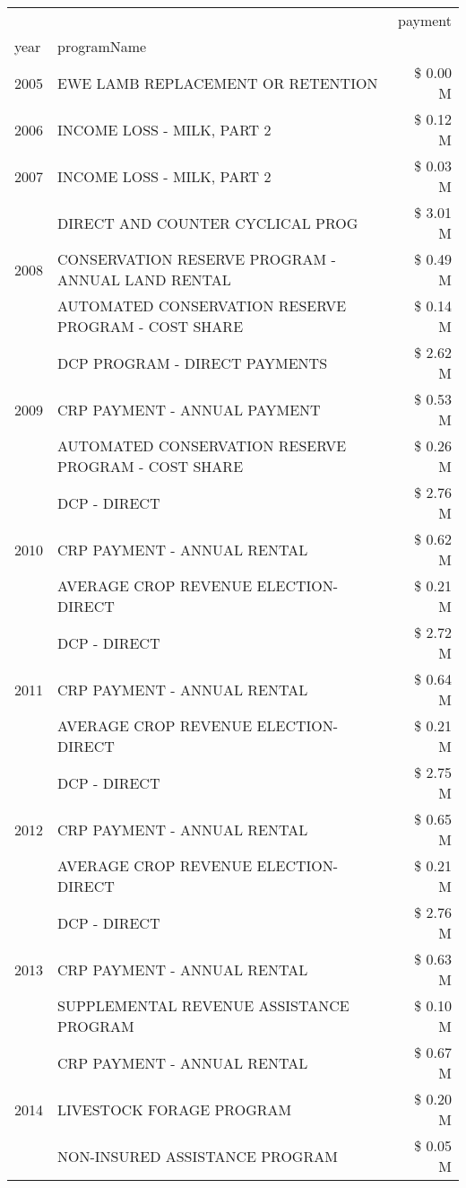 \begin{tabular}{llr}
\toprule
 &  & payment \\
year & programName &  \\
\midrule
2005 & EWE LAMB REPLACEMENT OR RETENTION & \$ 0.00 M \\
\cline{1-3}
2006 & INCOME LOSS - MILK, PART 2 & \$ 0.12 M \\
\cline{1-3}
2007 & INCOME LOSS - MILK, PART 2 & \$ 0.03 M \\
\cline{1-3}
\multirow[t]{3}{*}{2008} & DIRECT AND COUNTER CYCLICAL PROG & \$ 3.01 M \\
 & CONSERVATION RESERVE PROGRAM - ANNUAL LAND RENTAL & \$ 0.49 M \\
 & AUTOMATED CONSERVATION RESERVE PROGRAM - COST SHARE & \$ 0.14 M \\
\cline{1-3}
\multirow[t]{3}{*}{2009} & DCP PROGRAM - DIRECT PAYMENTS & \$ 2.62 M \\
 & CRP PAYMENT - ANNUAL PAYMENT & \$ 0.53 M \\
 & AUTOMATED CONSERVATION RESERVE PROGRAM - COST SHARE & \$ 0.26 M \\
\cline{1-3}
\multirow[t]{3}{*}{2010} & DCP - DIRECT & \$ 2.76 M \\
 & CRP PAYMENT - ANNUAL RENTAL & \$ 0.62 M \\
 & AVERAGE CROP REVENUE ELECTION-DIRECT & \$ 0.21 M \\
\cline{1-3}
\multirow[t]{3}{*}{2011} & DCP - DIRECT & \$ 2.72 M \\
 & CRP PAYMENT - ANNUAL RENTAL & \$ 0.64 M \\
 & AVERAGE CROP REVENUE ELECTION-DIRECT & \$ 0.21 M \\
\cline{1-3}
\multirow[t]{3}{*}{2012} & DCP - DIRECT & \$ 2.75 M \\
 & CRP PAYMENT - ANNUAL RENTAL & \$ 0.65 M \\
 & AVERAGE CROP REVENUE ELECTION-DIRECT & \$ 0.21 M \\
\cline{1-3}
\multirow[t]{3}{*}{2013} & DCP - DIRECT & \$ 2.76 M \\
 & CRP PAYMENT - ANNUAL RENTAL & \$ 0.63 M \\
 & SUPPLEMENTAL REVENUE ASSISTANCE PROGRAM & \$ 0.10 M \\
\cline{1-3}
\multirow[t]{3}{*}{2014} & CRP PAYMENT - ANNUAL RENTAL & \$ 0.67 M \\
 & LIVESTOCK FORAGE PROGRAM & \$ 0.20 M \\
 & NON-INSURED ASSISTANCE PROGRAM & \$ 0.05 M \\

\end{tabular}
